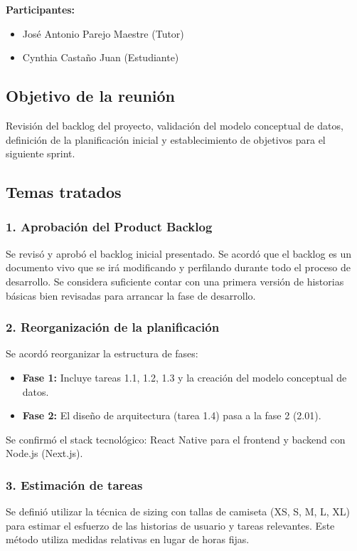 \textbf{Participantes:}
\begin{itemize}
    \item José Antonio Parejo Maestre (Tutor)
    \item Cynthia Castaño Juan (Estudiante)
\end{itemize}

\subsection*{Objetivo de la reunión}
Revisión del backlog del proyecto, validación del modelo conceptual de datos, definición de la planificación inicial y establecimiento de objetivos para el siguiente sprint.

\subsection*{Temas tratados}

\subsubsection*{1. Aprobación del Product Backlog}
Se revisó y aprobó el backlog inicial presentado. Se acordó que el backlog es un documento vivo que se irá modificando y perfilando durante todo el proceso de desarrollo. Se considera suficiente contar con una primera versión de historias básicas bien revisadas para arrancar la fase de desarrollo.

\subsubsection*{2. Reorganización de la planificación}
Se acordó reorganizar la estructura de fases:

\begin{itemize}
    \item \textbf{Fase 1:} Incluye tareas 1.1, 1.2, 1.3 y la creación del modelo conceptual de datos.
    \item \textbf{Fase 2:} El diseño de arquitectura (tarea 1.4) pasa a la fase 2 (2.01).
\end{itemize}

Se confirmó el stack tecnológico: React Native para el frontend y backend con Node.js (Next.js).

\subsubsection*{3. Estimación de tareas}
Se definió utilizar la técnica de sizing con tallas de camiseta (XS, S, M, L, XL) para estimar el esfuerzo de las historias de usuario y tareas relevantes. Este método utiliza medidas relativas en lugar de horas fijas.

